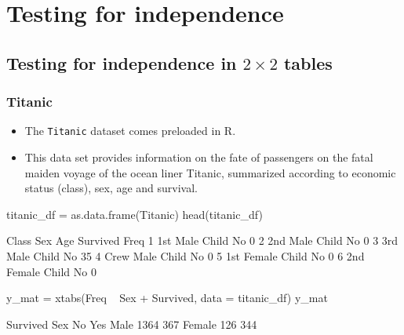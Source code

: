 \documentclass[a4paper]{article}
\begin{document}
\section{Testing for independence}\label{sec:8}
\subsection{Testing for independence in \texorpdfstring{\( 2 \times 2 \)}{2 x 2} tables}
\subsubsection{Titanic}
\begin{itemize}
	\item The \lstinline|Titanic| dataset comes preloaded in R.
	\item This data set provides information on the fate of passengers on the fatal maiden voyage of the ocean liner Titanic, summarized according to economic status (class), sex, age and survival.
\end{itemize}
\begin{Schunk}
\begin{Sinput}
titanic_df = as.data.frame(Titanic)
head(titanic_df)
\end{Sinput}
\begin{Soutput}
  Class    Sex   Age Survived Freq
1   1st   Male Child       No    0
2   2nd   Male Child       No    0
3   3rd   Male Child       No   35
4  Crew   Male Child       No    0
5   1st Female Child       No    0
6   2nd Female Child       No    0
\end{Soutput}
\begin{Sinput}
y_mat = xtabs(Freq ~ Sex + Survived,
              data = titanic_df)
y_mat
\end{Sinput}
\begin{Soutput}
        Survived
Sex        No  Yes
  Male   1364  367
  Female  126  344
\end{Soutput}
\end{Schunk}
\end{document}

